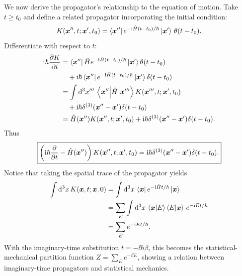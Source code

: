 \begin{center}\end{center}
We now derive the propagator's relationship to the equation of motion. Take $t\ge t_0$ and define a related propagator incorporating the initial condition:
\begin{equation}
K(\bm{x}'',t;\bm{x}',t_0)
=\left\langle\bm{x}''\right|e^{-\mathrm{i}\hat{H}(t-t_0)/\hbar}\left|\bm{x}'\right\rangle\,\theta(t-t_0).
\end{equation}
Differentiate with respect to $t$:
\begin{equation}
\begin{split}
\mathrm{i}\hbar\frac{\partial K}{\partial t}
&=\left\langle\bm{x}''\right|\hat{H} e^{-\mathrm{i}\hat{H}(t-t_0)/\hbar}\left|\bm{x}'\right\rangle\theta(t-t_0)\\
&\quad+\mathrm{i}\hbar\left\langle\bm{x}''\right|e^{-\mathrm{i}\hat{H}(t-t_0)/\hbar}\left|\bm{x}'\right\rangle\delta(t-t_0)\\
&=\int\mathrm{d}^3x'''\,\left\langle\bm{x}''\middle|\hat{H}\middle|\bm{x}'''\right\rangle
K(\bm{x}''',t;\bm{x}',t_0)\\
&\quad+\mathrm{i}\hbar\delta^{(3)}(\bm{x}''-\bm{x}')\delta(t-t_0)\\
&=\hat{H}(\bm{x}'')K(\bm{x}'',t;\bm{x}',t_0)
+\mathrm{i}\hbar\delta^{(3)}(\bm{x}''-\bm{x}')\delta(t-t_0).
\end{split}
\end{equation}
Thus
\begin{equation}
\boxed{\left(\mathrm{i}\hbar\frac{\partial}{\partial t}-\hat{H}(\bm{x}'')\right)
K(\bm{x}'',t;\bm{x}',t_0)
=\mathrm{i}\hbar\delta^{(3)}(\bm{x}''-\bm{x}')\delta(t-t_0).}
\end{equation}
Notice that taking the spatial trace of the propagator yields
\begin{equation}
\begin{aligned}
\int\mathrm{d}^3x\,K(\bm{x},t;\bm{x},0)
&=\int\mathrm{d}^3x\,\left\langle\bm{x}\right|e^{-\mathrm{i}\hat{H}t/\hbar}\left|\bm{x}\right\rangle\\
&=\sum_E\int\mathrm{d}^3x\,\left\langle\bm{x}\middle|E\right\rangle\left\langle E\middle|\bm{x}\right\rangle
\,e^{-\mathrm{i} Et/\hbar}\\
&=\sum_E e^{-\mathrm{i} Et/\hbar}.
\end{aligned}
\end{equation}
With the imaginary-time substitution $t=-\ii\hbar\beta$, this becomes the statistical-mechanical partition function $Z=\sum_Ee^{-\beta E}$, showing a relation between imaginary-time propagators and statistical mechanics.

